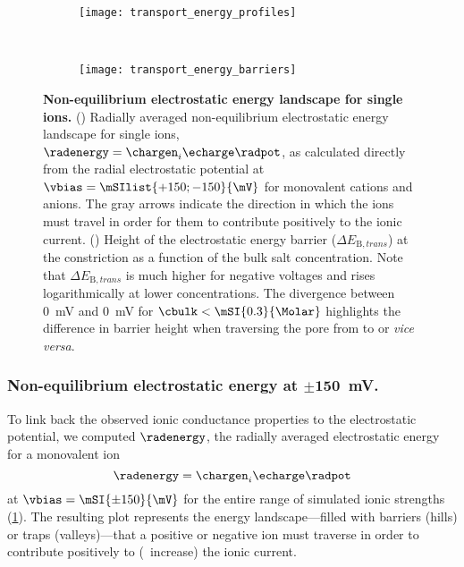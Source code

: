 %
\begin{figure}[p]
  \centering
  
  \begin{subfigure}[t]{11cm}
    \centering
    \caption{}\vspace{-5mm}\label{fig:transport_energy_profiles}
    \texttt{[image: transport\_energy\_profiles]}
  \end{subfigure}
  \\
  \begin{subfigure}[t]{9cm}
    \centering
    \caption{}\vspace{-3mm}\label{fig:transport_energy_barriers}
    \texttt{[image: transport\_energy\_barriers]}
  \end{subfigure}

  \caption[Non-equilibrium electrostatic energy landscape for single ions]%
  {%
    \textbf{Non-equilibrium electrostatic energy landscape for single ions.}
    ()
    Radially averaged non-equilibrium electrostatic energy landscape for single ions, $\radenergy =
    \chargen_{i} \echarge \radpot$, as calculated directly from the radial electrostatic potential at $\vbias
    = \mSIlist{+150;-150}{\mV}$ for monovalent cations and anions. The gray arrows indicate the direction in
    which the ions must travel in order for them to contribute positively to the ionic current.
    ()
    Height of the electrostatic energy barrier ($\Delta E_{\text{B},\mathit{trans}}$) at the \transi{}
    constriction as a function of the bulk salt concentration. Note that $\Delta E_{\text{B},\mathit{trans}}$
    is much higher for negative voltages and rises logarithmically at lower concentrations. The divergence
    between \SI[explicit-sign=+]{0}{\mV} and \SI[explicit-sign=-]{0}{\mV} for $\cbulk < \mSI{0.3}{\Molar}$
    highlights the difference in barrier height when traversing the pore from \cisi{} to \transi{} or
    \textit{vice versa}.
  }\label{fig:transport_energy}
\end{figure}
%

\subsubsection{Non-equilibrium electrostatic energy at $\mathbf{\pm150}$~mV.}
%

To link back the observed ionic conductance properties to the electrostatic potential, we computed
$\radenergy$, the radially averaged electrostatic energy for a monovalent ion
%
\begin{equation}\label{eq:epnp-ns_radenergy}
  \radenergy = \chargen_{i} \echarge \radpot
\end{equation}
%
at $\vbias = \mSI{\pm150}{\mV}$ for the entire range of simulated ionic strengths
(\cref{fig:transport_energy_profiles}). The resulting plot represents the energy landscape---filled with
barriers (hills) or traps (valleys)---that a positive or negative ion must traverse in order to contribute
positively to (\ie~increase) the ionic current.

